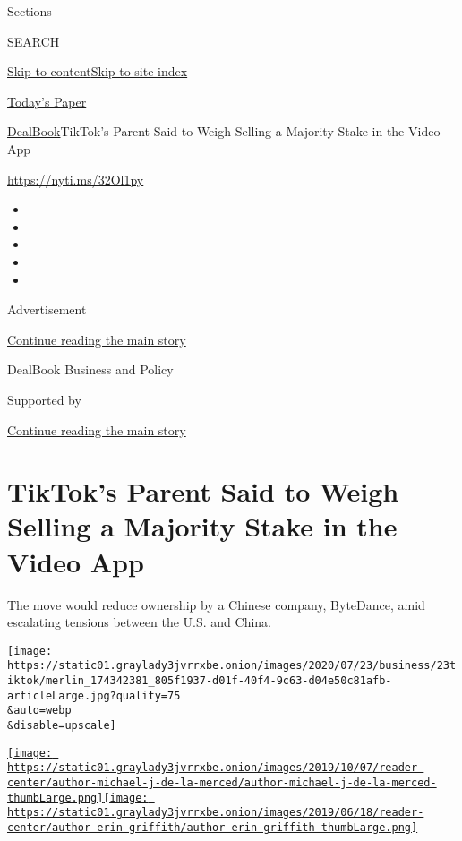 Sections

SEARCH

\protect\hyperlink{site-content}{Skip to
content}\protect\hyperlink{site-index}{Skip to site index}

\href{https://myaccount.nytimes3xbfgragh.onion/auth/login?response_type=cookie\&client_id=vi}{}

\href{https://www.nytimes3xbfgragh.onion/section/todayspaper}{Today's
Paper}

\href{/section/business/dealbook}{DealBook}\textbar{}TikTok's Parent
Said to Weigh Selling a Majority Stake in the Video App

\href{https://nyti.ms/32Ol1py}{https://nyti.ms/32Ol1py}

\begin{itemize}
\item
\item
\item
\item
\item
\end{itemize}

Advertisement

\protect\hyperlink{after-top}{Continue reading the main story}

DealBook Business and Policy

Supported by

\protect\hyperlink{after-sponsor}{Continue reading the main story}

\hypertarget{tiktoks-parent-said-to-weigh-selling-a-majority-stake-in-the-video-app}{%
\section{TikTok's Parent Said to Weigh Selling a Majority Stake in the
Video
App}\label{tiktoks-parent-said-to-weigh-selling-a-majority-stake-in-the-video-app}}

The move would reduce ownership by a Chinese company, ByteDance, amid
escalating tensions between the U.S. and China.

\texttt{[image: https://static01.graylady3jvrrxbe.onion/images/2020/07/23/business/23tiktok/merlin\_174342381\_805f1937-d01f-40f4-9c63-d04e50c81afb-articleLarge.jpg?quality=75\\\&auto=webp\\\&disable=upscale]}

\href{https://www.nytimes3xbfgragh.onion/by/michael-j-de-la-merced}{\texttt{[image: https://static01.graylady3jvrrxbe.onion/images/2019/10/07/reader-center/author-michael-j-de-la-merced/author-michael-j-de-la-merced-thumbLarge.png]}}\href{https://www.nytimes3xbfgragh.onion/by/erin-griffith}{\texttt{[image: https://static01.graylady3jvrrxbe.onion/images/2019/06/18/reader-center/author-erin-griffith/author-erin-griffith-thumbLarge.png]}}

